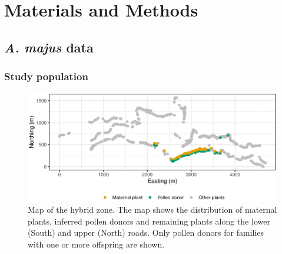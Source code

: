 \documentclass[10pt, a4paper, twocolumn]{article} %
\begin{document}

\section{Materials and Methods}

\subsection{\textit{A. majus} data}

\subsubsection{Study population}

\begin{figure}
    \centering
	\includegraphics[]{fig-map.eps} %
	\caption{
        Map of the hybrid zone.
        The map shows the distribution of maternal plants, inferred pollen donors and remaining plants along the lower (South) and upper (North) roads. Only pollen donors for families with one or more offspring are shown.}
	\label{fig:map} %
\end{figure}
\end{document}
